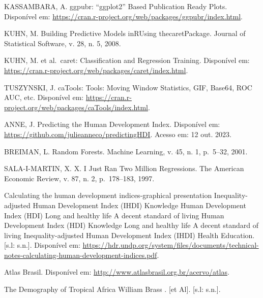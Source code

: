 \documentclass[
]{article}
\begin{document}
KASSAMBARA, A. ggpubr: ``ggplot2'' Based Publication Ready Plots.
Disponível em:
\url{https://cran.r-project.org/web/packages/ggpubr/index.html}.

KUHN, M. Building Predictive Models inRUsing thecaretPackage. Journal of
Statistical Software, v. 28, n. 5, 2008.

KUHN, M. et al.~caret: Classification and Regression Training.
Disponível em:
\url{https://cran.r-project.org/web/packages/caret/index.html}.

TUSZYNSKI, J. caTools: Tools: Moving Window Statistics, GIF, Base64, ROC
AUC, etc. Disponível em:
\url{https://cran.r-project.org/web/packages/caTools/index.html}.

ANNE, J. Predicting the Human Development Index. Disponível em:
\url{https://github.com/julieanneco/predictingHDI}. Acesso em: 12 out.
2023.

BREIMAN, L. Random Forests. Machine Learning, v. 45, n. 1, p.~5--32,
2001.

SALA-I-MARTIN, X. X. I Just Ran Two Million Regressions. The American
Economic Review, v. 87, n. 2, p.~178--183, 1997.

Calculating the human development indices-graphical presentation
Inequality-adjusted Human Development Index (IHDI) Knowledge Human
Development Index (HDI) Long and healthy life A decent standard of
living Human Development Index (HDI) Knowledge Long and healthy life A
decent standard of living Inequality-adjusted Human Development Index
(IHDI) Health Education. {[}s.l: s.n.{]}. Disponível em:
\url{https://hdr.undp.org/system/files/documents/technical-notes-calculating-human-development-indices.pdf}.

Atlas Brasil. Disponível em:
\url{http://www.atlasbrasil.org.br/acervo/atlas}.

The Demography of Tropical Africa William Brass . {[}et Al{]}. {[}s.l:
s.n.{]}.
\end{document}
